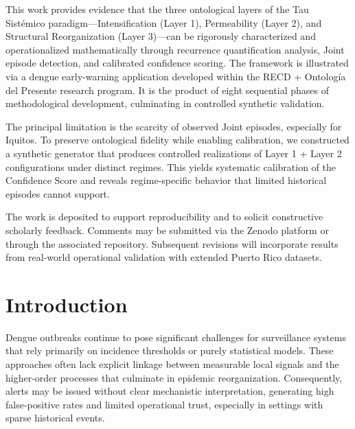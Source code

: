 \documentclass[11pt,a4paper]{article}
\begin{document}
\begin{zenodolletter}
This work provides evidence that the three ontological layers of the Tau Sistémico paradigm---Intensification (Layer 1), Permeability (Layer 2), and Structural Reorganization (Layer 3)---can be rigorously characterized and operationalized mathematically through recurrence quantification analysis, Joint episode detection, and calibrated confidence scoring. The framework is illustrated via a dengue early-warning application developed within the RECD + Ontología del Presente research program. It is the product of eight sequential phases of methodological development, culminating in controlled synthetic validation.

The principal limitation is the scarcity of observed Joint episodes, especially for Iquitos. To preserve ontological fidelity while enabling calibration, we constructed a synthetic generator that produces controlled realizations of Layer 1 + Layer 2 configurations under distinct regimes. This yields systematic calibration of the Confidence Score and reveals regime-specific behavior that limited historical episodes cannot support.

The work is deposited to support reproducibility and to solicit constructive scholarly feedback. Comments may be submitted via the Zenodo platform or through the associated repository. Subsequent revisions will incorporate results from real-world operational validation with extended Puerto Rico datasets.
\end{zenodolletter}

\vspace{0.5em}

\section{Introduction}

Dengue outbreaks continue to pose significant challenges for surveillance systems that rely primarily on incidence thresholds or purely statistical models. These approaches often lack explicit linkage between measurable local signals and the higher-order processes that culminate in epidemic reorganization. Consequently, alerts may be issued without clear mechanistic interpretation, generating high false-positive rates and limited operational trust, especially in settings with sparse historical events.
\end{document}

